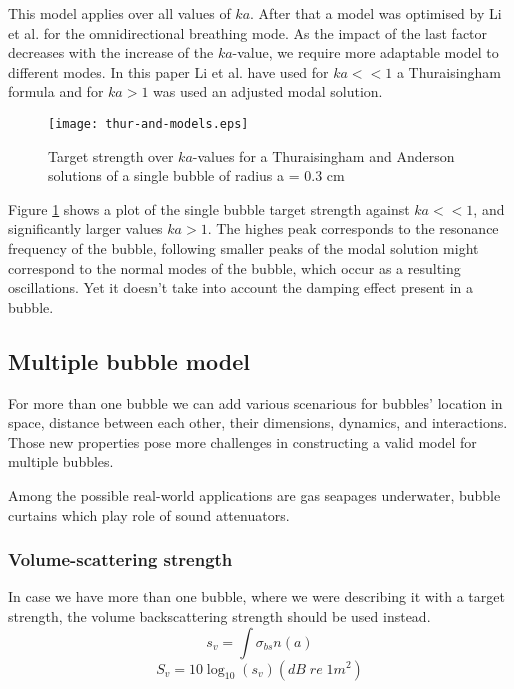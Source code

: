 This model applies over all values of $ka$. After that a model was optimised by Li et al. \cite[]{li_broadband_2020} for the omnidirectional breathing mode. As the impact of the last factor decreases with the increase of the $ka$-value, we require more adaptable model to different modes. In this paper Li et al. have used for $ka << 1$ a Thuraisingham formula and for $ka>1$ was used an adjusted modal solution.

\begin{figure}[H]
    \centering
    \texttt{[image: thur-and-models.eps]}
    \caption*{Target strength over $ka$-values for a Thuraisingham and Anderson solutions of a single bubble of radius a = 0.3 cm}
    \label{fig:thur-anderson}
\end{figure}

Figure \ref*{fig:thur-anderson} shows a plot of the single bubble target strength against  $ka << 1$, and significantly larger values $ka > 1$. The highes peak corresponds to the resonance frequency of the bubble, following smaller peaks of the modal solution might correspond to the normal modes of the bubble, which occur as a resulting oscillations. Yet it doesn't take into account the damping effect present in a bubble.


\subsection{Multiple bubble model}

For more than one bubble we can add various scenarious for bubbles' location in space, distance between each other, their dimensions, dynamics, and interactions. Those new properties pose more challenges in constructing a valid model for multiple bubbles.

Among the possible real-world applications are gas seapages underwater, bubble curtains which play role of sound attenuators.


\subsubsection{Volume-scattering strength} 
In case we have more than one bubble, where we were describing it with a target strength, the volume backscattering strength should be used instead.
\[s_v = \int\sigma_{bs}n(a)\]
\[S_v = 10\log_{10}(s_v)(dB\;re\;1m^2)\]

